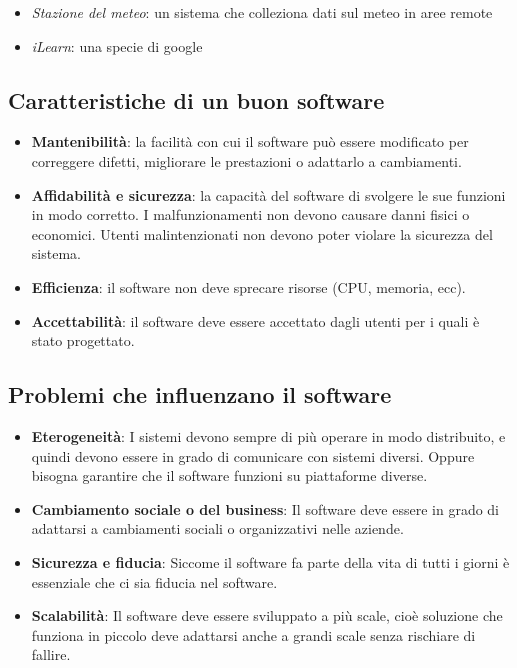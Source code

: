 \documentclass[a4paper]{article}
\begin{document}
\begin{itemize}
  \item \textit{Stazione del meteo}: un sistema che colleziona dati sul meteo in aree remote

  \item \textit{iLearn}: una specie di google
\end{itemize}

\subsection{Caratteristiche di un buon software}
\begin{itemize}
  \item \textbf{Mantenibilità}: la facilità con cui il software può essere modificato
  per correggere difetti, migliorare le prestazioni o adattarlo a cambiamenti.


  \item \textbf{Affidabilità e sicurezza}: la capacità del software di svolgere le sue
  funzioni in modo corretto. I malfunzionamenti non devono causare danni fisici o economici.
  Utenti malintenzionati non devono poter violare la sicurezza del sistema.
  
  \item \textbf{Efficienza}: il software non deve sprecare risorse (CPU, memoria, ecc).

  \item \textbf{Accettabilità}: il software deve essere accettato dagli utenti per i quali
  è stato progettato.
\end{itemize}

\subsection{Problemi che influenzano il software}
\begin{itemize}
  \item \textbf{Eterogeneità}:
    I sistemi devono sempre di più operare in modo distribuito, e quindi devono essere in grado
    di comunicare con sistemi diversi. Oppure bisogna garantire che il software funzioni su
    piattaforme diverse.

  \item 
    \textbf{Cambiamento sociale o del business}:
    Il software deve essere in grado di adattarsi a cambiamenti sociali o organizzativi
    nelle aziende.

  \item 
    \textbf{Sicurezza e fiducia}:
    Siccome il software fa parte della vita di tutti i giorni è essenziale che ci sia
    fiducia nel software.

  \item 
    \textbf{Scalabilità}:
    Il software deve essere sviluppato a più scale, cioè soluzione che funziona in piccolo
    deve adattarsi anche a grandi scale senza rischiare di fallire.
\end{itemize}
\end{document}
